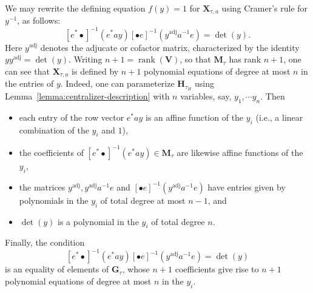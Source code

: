 \documentclass[reqno]{amsart}
\DeclareMathOperator{\rank}{rank}
\theoremstyle{plain} \newtheorem{theorem} {Theorem} \newtheorem{conjecture} {Conjecture} \newtheorem{corollary} [theorem] {Corollary} \newtheorem{proposition} [theorem] {Proposition} \newtheorem{fact} [theorem] {Fact}
\theoremstyle{definition} \newtheorem{definition} [theorem] {Definition}
\theoremstyle{itplain} %
\begin{document}
\begin{remark}\label{remark:rewrite-defining-equations-for-X-as-polynomials}
  We may rewrite the defining equation $f(y) = 1$ for $\mathbf{X}_{\tau,a}$ using Cramer's rule for $y^{-1}$, as follows:
  \begin{equation*} {[e^* \bullet]}^{-1}( e^* a y) {[\bullet e]}^{-1}(y^{\mathrm{adj}} a^{-1} e) = \det(y).
  \end{equation*}
  Here $y^{\mathrm{adj}}$ denotes the adjucate or cofactor matrix, characterized by the identity $y y^{\mathrm{adj}} = \det(y)$.  Writing $n+1 = \rank(\mathbf{V})$, so that $\mathbf{M}_{\tau}$ has rank $n+1$, one can see that $\mathbf{X}_{\tau,a}$ is defined by $n+1$ polynomial equations of degree at most $n$ in the entries of $y$.  Indeed, one can parameterize $\mathbf{H}_{\tau_H}$ using Lemma~\ref{lemma:centralizer-description} with $n$ variables, say, $y_1,\cdots y_n$.  Then
  \begin{itemize}
  \item each entry of the row vector $e^* a y$ is an affine function of the $y_i$ (i.e., a linear combination of the $y_i$ and $1$),
  \item the coefficients of ${[e^* \bullet]}^{-1}( e^* a y)\in \mathbf{M}_\tau$ are likewise affine functions of the $y_i$,
  \item the matrices $y^{\mathrm{adj}}, y^{\mathrm{adj}} a^{-1} e$ and ${[\bullet e]}^{-1}(y^{\mathrm{adj}} a^{-1} e) $ have entries given by polynomials in the $y_i$ of total degree at most $n-1$, and
  \item $\det(y)$ is a polynomial in the $y_i$ of total degree $n$.
  \end{itemize}
  Finally, the condition
  \begin{equation*}
    {[e^* \bullet]}^{-1}( e^* a y) {[\bullet e]}^{-1}(y^{\mathrm{adj}} a^{-1} e) = \det(y)
  \end{equation*}
  is an equality of elements of $\mathbf{G}_\tau$, whose $n+1$ coefficients give rise to $n+1$ polynomial equations of degree at most $n$ in the $y_i$.
\end{remark}
\end{document}
